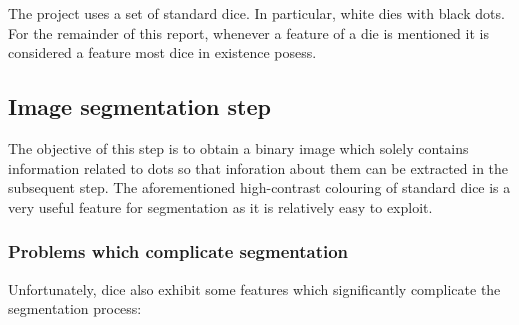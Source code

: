 The project uses a set of standard dice. In particular, white dies with black dots. For the remainder of this report, whenever a feature of a die is mentioned it is considered a feature most dice in existence posess.

\subsection{Image segmentation step}
The objective of this step is to obtain a binary image which solely contains information related to dots so that inforation about them can be extracted in the subsequent step. The aforementioned high-contrast colouring of standard dice is a very useful feature for segmentation as it is relatively easy to exploit.

\subsubsection{Problems which complicate segmentation}
Unfortunately, dice also exhibit some features which significantly complicate the segmentation process:


